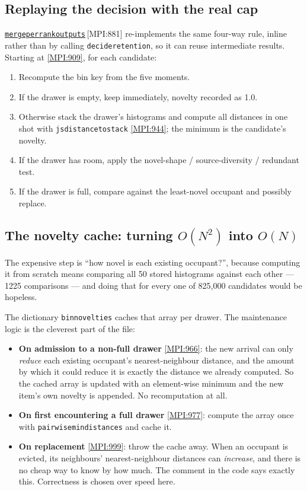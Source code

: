 \documentclass[11pt,a4paper]{report}
\newcommand{\srcbase}{vscode://file/Users/syellapa/Documents/Research/2026/ANSYS/Multi-ScalarPDF}
\newcommand{\srctag}[1]{{\footnotesize\textcolor{TagGray}{[#1]}}}
\newcommand{\Mpi}[2]{\href{\srcbase/EnsightPDFHybridDatasetMPI.py:#1}{\texttt{#2}}\,\srctag{MPI:#1}}
\newcommand{\MpiL}[1]{\href{\srcbase/EnsightPDFHybridDatasetMPI.py:#1}{\srctag{MPI:#1}}}
\newcommand{\code}[1]{\texttt{#1}}
\renewcommand{\_}{\origtextunderscore\allowbreak}
\begin{document}
\subsection*{Replaying the decision with the real cap}

\Mpi{881}{merge\_per\_rank\_outputs} re-implements the same four-way rule, inline rather than
by calling \code{decide\_retention}, so it can reuse intermediate results. Starting at
\MpiL{909}, for each candidate:

\begin{enumerate}
  \item Recompute the bin key from the five moments.
  \item If the drawer is empty, keep immediately, novelty recorded as 1.0.
  \item Otherwise stack the drawer's histograms and compute all distances in one shot with
        \code{js\_distance\_to\_stack} \MpiL{944}; the minimum is the candidate's novelty.
  \item If the drawer has room, apply the novel-shape / source-diversity / redundant test.
  \item If the drawer is full, compare against the least-novel occupant and possibly replace.
\end{enumerate}

\subsection*{The novelty cache: turning $O(N^2)$ into $O(N)$}

The expensive step is ``how novel is each existing occupant?'', because computing it from
scratch means comparing all 50 stored histograms against each other --- 1225 comparisons ---
and doing that for every one of 825{,}000 candidates would be hopeless.

The dictionary \code{bin\_novelties} caches that array per drawer. The maintenance logic is
the cleverest part of the file:

\begin{itemize}
  \item \textbf{On admission to a non-full drawer} \MpiL{966}: the new arrival can only
        \emph{reduce} each existing occupant's nearest-neighbour distance, and the amount by
        which it could reduce it is exactly the distance we already computed. So the cached
        array is updated with an element-wise minimum and the new item's own novelty is
        appended. No recomputation at all.
  \item \textbf{On first encountering a full drawer} \MpiL{977}: compute the array once with
        \code{pairwise\_min\_distances} and cache it.
  \item \textbf{On replacement} \MpiL{999}: throw the cache away. When an occupant is evicted,
        its neighbours' nearest-neighbour distances can \emph{increase}, and there is no cheap
        way to know by how much. The comment in the code says exactly this. Correctness is
        chosen over speed here.
\end{itemize}
\end{document}
